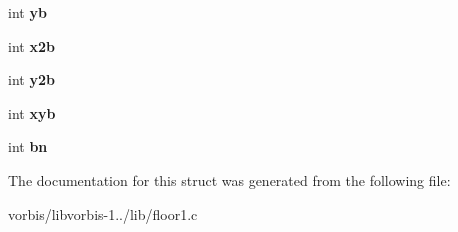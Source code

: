 \begin{DoxyCompactItemize}
\item 
\hypertarget{structlsfit__acc_af9a2278c05a1861ab193dc90badefce4}{int {\bfseries yb}}\label{structlsfit__acc_af9a2278c05a1861ab193dc90badefce4}

\item 
\hypertarget{structlsfit__acc_aefa3b90f474ae621805595d2a89ef2f0}{int {\bfseries x2b}}\label{structlsfit__acc_aefa3b90f474ae621805595d2a89ef2f0}

\item 
\hypertarget{structlsfit__acc_af8c258fca96de2da6190dd82b1a9e66e}{int {\bfseries y2b}}\label{structlsfit__acc_af8c258fca96de2da6190dd82b1a9e66e}

\item 
\hypertarget{structlsfit__acc_ab9e3ed10bb6252ede78e5514496391b4}{int {\bfseries xyb}}\label{structlsfit__acc_ab9e3ed10bb6252ede78e5514496391b4}

\item 
\hypertarget{structlsfit__acc_a5b0d1e6a5f5096c5c3bdfd3a516993f2}{int {\bfseries bn}}\label{structlsfit__acc_a5b0d1e6a5f5096c5c3bdfd3a516993f2}

\end{DoxyCompactItemize}


The documentation for this struct was generated from the following file\+:\begin{DoxyCompactItemize}
\item 
vorbis/libvorbis-\/1../lib/floor1.\+c\end{DoxyCompactItemize}
